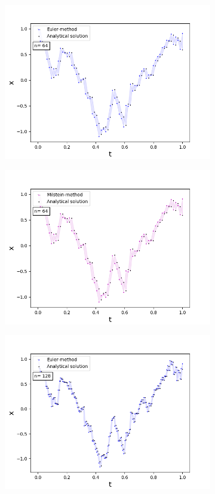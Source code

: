 \begin{figure}[!h]
\begin{subfigure}{0.49\linewidth}
     \includegraphics[scale=0.4]{Content/Graphics/Appendix/3ou}
   \end{subfigure}
   \begin{subfigure}{0.49\linewidth} \centering
     \includegraphics[scale=0.4]{Content/Graphics/Appendix/4ou}
   \end{subfigure}
   \begin{subfigure}{0.49\linewidth} \centering
     \includegraphics[scale=0.4]{Content/Graphics/Appendix/5ou}

\end{subfigure}
\end{figure}

